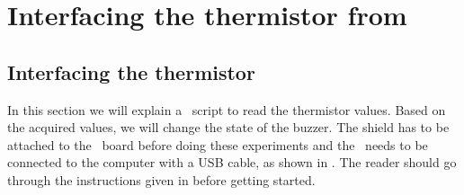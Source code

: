 \section{Interfacing the thermistor from \scilab}
\subsection{Interfacing the thermistor}
In this section we will explain a \scilab\ script to read the thermistor
values. Based on the acquired values, we will change
the state of the buzzer.  The shield has to be attached to the \arduino\ board
before doing these experiments and the \arduino\ needs to be connected to the computer
with a USB cable, as shown in .
The reader should go through the instructions given in
 before getting started.


